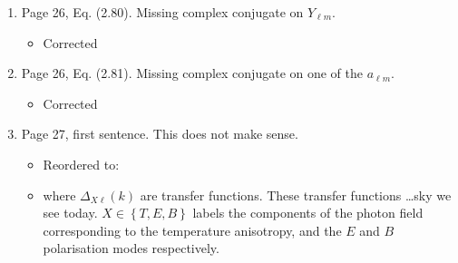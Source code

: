 \documentclass[11pt]{article}
\begin{document}
\begin{enumerate}
\item Page 26, Eq. (2.80). Missing complex conjugate on $Y_{\ell m}$.
  \begin{itemize}
    \item Corrected
  \end{itemize}
\item Page 26, Eq. (2.81). Missing complex conjugate on one of the
  $a_{\ell m}$.
  \begin{itemize}
    \item Corrected
  \end{itemize}
\item Page 27, first sentence. This does not make sense.
  \begin{itemize}
    \item Reordered to:
    \item where \(\Delta_{X\ell}(k)\) are transfer functions. These transfer functions \ldots  sky we see today. 
 \({X\in\left\{ T,E,B \right\}}\) labels the components of the photon field corresponding to the temperature anisotropy, and the \(E\) and \(B\) polarisation modes respectively.
  \end{itemize}
\end{enumerate}
\end{document}
